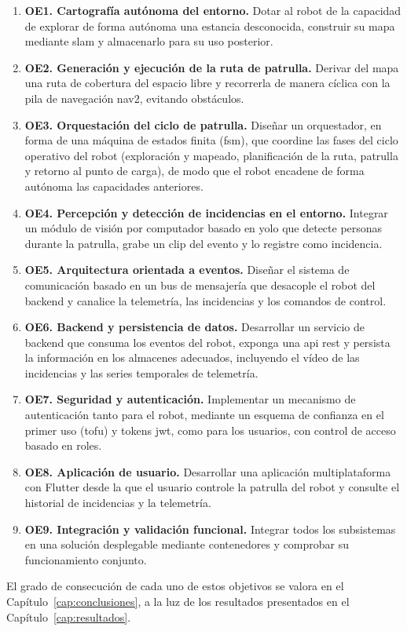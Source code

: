 \begin{enumerate}
  \item \textbf{OE1. Cartografía autónoma del entorno.} Dotar al robot de la
    capacidad de explorar de forma autónoma una estancia desconocida, construir
    su mapa mediante \gls{slam} y almacenarlo para su uso posterior.

  \item \textbf{OE2. Generación y ejecución de la ruta de patrulla.} Derivar del
    mapa una ruta de cobertura del espacio libre y recorrerla de manera cíclica
    con la pila de navegación \gls{nav2}, evitando obstáculos.

  \item \textbf{OE3. Orquestación del ciclo de patrulla.} Diseñar un orquestador,
    en forma de una máquina de estados finita (\acrshort{fsm}), que coordine las
    fases del ciclo operativo del robot (exploración y mapeado, planificación de
    la ruta, patrulla y retorno al punto de carga), de modo que el robot encadene
    de forma autónoma las capacidades anteriores.

  \item \textbf{OE4. Percepción y detección de incidencias en el entorno.}
    Integrar un módulo de visión por computador basado en \gls{yolo} que detecte
    personas durante la patrulla, grabe un clip del evento y lo registre como
    incidencia.

  \item \textbf{OE5. Arquitectura orientada a eventos.} Diseñar el sistema de
    comunicación basado en un bus de mensajería que desacople el robot del
    backend y canalice la telemetría, las incidencias y los comandos de control.

  \item \textbf{OE6. Backend y persistencia de datos.} Desarrollar un servicio
    de backend que consuma los eventos del robot, exponga una \gls{api}
    \gls{rest} y persista la información en los almacenes adecuados, incluyendo
    el vídeo de las incidencias y las series temporales de telemetría.

  \item \textbf{OE7. Seguridad y autenticación.} Implementar un mecanismo de
    autenticación tanto para el robot, mediante un esquema de confianza en el
    primer uso (\gls{tofu}) y tokens \gls{jwt}, como para los usuarios, con
    control de acceso basado en roles.

  \item \textbf{OE8. Aplicación de usuario.} Desarrollar una aplicación
    multiplataforma con \mbox{Flutter} desde la que el usuario controle la
    patrulla del robot y consulte el historial de incidencias y la telemetría.

  \item \textbf{OE9. Integración y validación funcional.} Integrar todos los
    subsistemas en una solución desplegable mediante contenedores y comprobar su
    funcionamiento conjunto.
\end{enumerate}

El grado de consecución de cada uno de estos objetivos se valora en el
Capítulo~\ref{cap:conclusiones}, a la luz de los resultados presentados en el
Capítulo~\ref{cap:resultados}.
